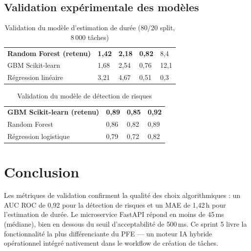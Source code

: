 \subsection{Validation expérimentale des modèles}

\begin{table}[H]
  \centering
  \caption{Validation du modèle d'estimation de durée (80/20 split, 8\,000 tâches)}
  \label{tab:valid_duree}
  \begin{tabularx}{\textwidth}{L{4.5cm}C{2.5cm}C{2.5cm}C{2cm}C{2.5cm}}
    \toprule
     &  &  &  &  \\
    \midrule
    \textbf{Random Forest (retenu)} & \textbf{1,42} & \textbf{2,18} & \textbf{0,82} & 8,4 \\
    GBM Scikit-learn & 1,68 & 2,54 & 0,76 & 12,1 \\
    Régression linéaire & 3,21 & 4,67 & 0,51 & 0,3 \\
    \bottomrule
  \end{tabularx}
\end{table}

\begin{table}[H]
  \centering
  \caption{Validation du modèle de détection de risques}
  \label{tab:valid_risque}
  \begin{tabularx}{\textwidth}{L{4.5cm}C{3cm}C{3cm}C{3cm}}
    \toprule
     &  &  &  \\
    \midrule
    \textbf{GBM Scikit-learn (retenu)} & \textbf{0,89} & \textbf{0,85} & \textbf{0,92} \\
    Random Forest & 0,86 & 0,82 & 0,89 \\
    Régression logistique & 0,79 & 0,72 & 0,82 \\
    \bottomrule
  \end{tabularx}
\end{table}

\section*{Conclusion}
Les métriques de validation confirment la qualité des choix algorithmiques : un
AUC ROC de 0,92 pour la détection de risques et un MAE de 1,42\,h pour l'estimation
de durée. Le microservice FastAPI répond en moins de 45\,ms (médiane), bien en dessous
du seuil d'acceptabilité de 500\,ms. Ce sprint 5 livre la fonctionnalité la plus
différenciante du PFE — un moteur IA hybride opérationnel intégré nativement dans
le workflow de création de tâches.
